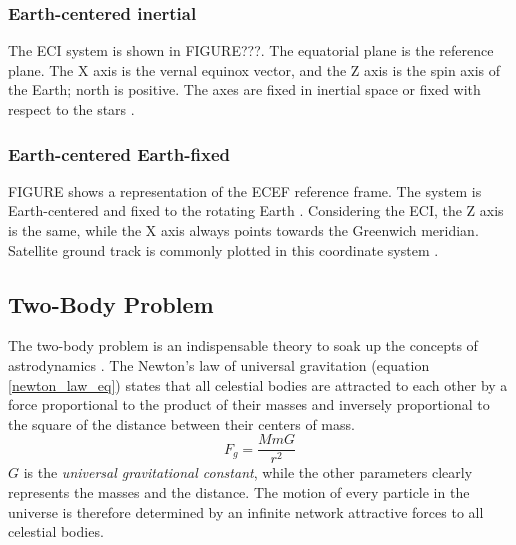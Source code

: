 \subsubsection{Earth-centered inertial}
The ECI system is shown in FIGURE???.
The equatorial plane is the reference plane.
The X axis is the vernal equinox vector, and the Z axis is the spin axis of the Earth; north is positive.
The axes are fixed in inertial space or fixed with respect to the stars \cite{brown1998spacecraft}.


\subsubsection{Earth-centered Earth-fixed}
FIGURE shows a representation of the ECEF reference frame.
The system is Earth-centered and fixed to the rotating Earth \cite{vallado2013fundamentals}.
Considering the ECI, the Z axis is the same, while the X axis always points towards the Greenwich meridian.
Satellite ground track is commonly plotted in this coordinate system \cite{brown1998spacecraft}.


\subsection{Two-Body Problem} \label{twobody_par}
The two-body problem is an indispensable theory to soak up the concepts of astrodynamics \cite{vallado2013fundamentals}.
The Newton's law of universal gravitation (equation \ref{newton_law_eq}) states that all celestial bodies are attracted to each other by a force proportional to the product of their masses and inversely proportional to the square of the distance between their centers of mass.
\begin{equation} \label{newton_law_eq}
    F_g = \frac{M m G}{r^2}
\end{equation}
$G$ is the \textit{universal gravitational constant}, while the other parameters clearly represents the masses and the distance.
The motion of every particle in the universe is therefore determined by an infinite network attractive forces to all celestial bodies.

